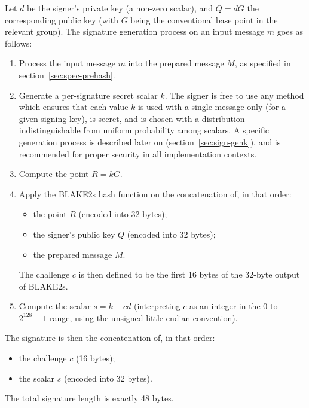 \documentclass{llncs}
\begin{document}
Let $d$ be the signer's private key (a non-zero scalar), and $Q = dG$
the corresponding public key (with $G$ being the conventional base point
in the relevant group). The signature generation process on an
input message $m$ goes as follows:
\begin{enumerate}

    \item Process the input message $m$ into the prepared message $M$,
    as specified in section~\ref{sec:spec-prehash}.

    \item Generate a per-signature secret scalar $k$. The signer is free
    to use any method which ensures that each value $k$ is used with a
    single message only (for a given signing key), is secret, and is
    chosen with a distribution indistinguishable from uniform
    probability among scalars. A specific generation process is
    described later on (section~\ref{sec:sign-genk}), and is recommended
    for proper security in all implementation contexts.

    \item Compute the point $R = kG$.

    \item \label{step:siggen-challenge}Apply the BLAKE2s hash function
    on the concatenation of, in that order:
    \begin{itemize}

        \item the point $R$ (encoded into 32 bytes);

        \item the signer's public key $Q$ (encoded into 32 bytes);

        \item the prepared message $M$.

    \end{itemize}
    The challenge $c$ is then defined to be the first 16 bytes of the
    32-byte output of BLAKE2s.

    \item Compute the scalar $s = k + cd$ (interpreting $c$ as an
    integer in the $0$ to $2^{128}-1$ range, using the unsigned
    little-endian convention).

\end{enumerate}
The signature is then the concatenation of, in that order:
\begin{itemize}

    \item the challenge $c$ (16 bytes);
    
    \item the scalar $s$ (encoded into 32 bytes).

\end{itemize}
The total signature length is exactly 48 bytes.
\end{document}
